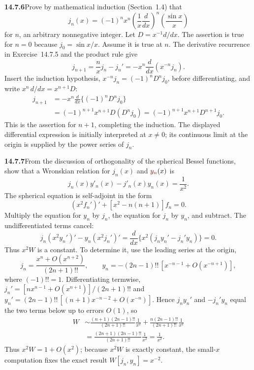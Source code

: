 \par\bigskip
\noindent\textbf{14.7.6}\quad Prove by mathematical induction
(Section~1.4) that
\[
j_{n}(x)=(-1)^{n}x^{n}\left(\frac{1}{x}\frac{d}{dx}\right)^{n}
\left(\frac{\sin x}{x}\right)
\]
for $n$, an arbitrary nonnegative integer.
\solution
Let $D=x^{-1}d/dx$. The assertion is true for $n=0$
because $j_0=\sin x/x$. Assume it is true at $n$. The derivative
recurrence in Exercise~14.7.5 and the product rule give
\[
j_{n+1}=\frac nxj_n-j_n'
=-x^n\frac d{dx}(x^{-n}j_n).
\]
Insert the induction hypothesis, $x^{-n}j_n=(-1)^nD^nj_0$, before
differentiating, and write $x^n\,d/dx=x^{n+1}D$:
\begin{align*}
j_{n+1}
&=-x^n\frac d{dx}\{(-1)^nD^nj_0\}\\
&=(-1)^{n+1}x^{n+1}D(D^nj_0)
=(-1)^{n+1}x^{n+1}D^{n+1}j_0.
\end{align*}
This is the assertion for $n+1$, completing the induction.
The displayed differential expression is initially interpreted at
$x\ne0$; its continuous limit at the origin is supplied by the
power series of $j_n$.

\par\bigskip
\noindent\textbf{14.7.7}\quad From the discussion of orthogonality of
the spherical Bessel functions, show that a Wronskian relation for
$j_{n}(x)$ and $\erratum{y_{n}}(x)$ is
\[
j_{n}(x)y'_{n}(x)-j'_{n}(x)y_{n}(x)=\frac{1}{x^{2}}.
\]
\solution
The spherical equation is self-adjoint in the form
\[
(x^2 f_n')'+[x^2-n(n+1)]f_n=0.
\]
Multiply the equation for $y_n$ by $j_n$, the equation for $j_n$
by $y_n$, and subtract. The undifferentiated terms cancel:
\[
j_n(x^2y_n')'-y_n(x^2j_n')'
=\frac d{dx}\{x^2(j_ny_n'-j_n'y_n)\}=0.
\]
Thus $x^2W$ is a constant. To determine it, use the leading
series at the origin,
\[
j_n=\frac{x^n+O(x^{n+2})}{(2n+1)!!},\qquad
y_n=-(2n-1)!!\,[x^{-n-1}+O(x^{-n+1})],
\]
where $(-1)!!=1$. Differentiating termwise,
$j_n'=[nx^{n-1}+O(x^{n+1})]/(2n+1)!!$ and
$y_n'=(2n-1)!!\,[(n+1)x^{-n-2}+O(x^{-n})]$.
Hence $j_ny_n'$ and $-j_n'y_n$ equal the two terms below up to
errors $O(1)$, so
\begin{align*}
W&\sim\frac{(n+1)(2n-1)!!}{(2n+1)!!}\frac1{x^2}
+\frac{n(2n-1)!!}{(2n+1)!!}\frac1{x^2}\\
&=\frac{(2n+1)(2n-1)!!}{(2n+1)!!}\frac1{x^2}
=\frac1{x^2}.
\end{align*}
Thus $x^2W=1+O(x^2)$; because $x^2W$ is exactly constant, the
small-$x$ computation fixes the exact result
$\boxed{W[j_n,y_n]=x^{-2}}$.

